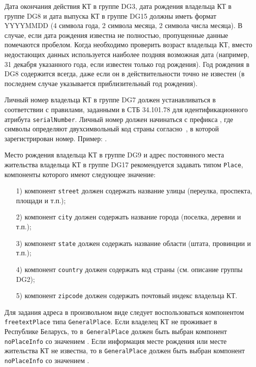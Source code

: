 Дата окончания действия КТ в группе DG3, дата рождения владельца КТ в группе DG8 
и дата выпуска КТ в группе DG15 должны иметь формат YYYYMMDD 
(4 символа года, 2 символа месяца, 2 символа 
числа месяца). В случае, если дата рождения известна не полностью, 
пропущенные данные помечаются пробелом. Когда необходимо проверить 
возраст владельца КТ, вместо недостающих данных используется наиболее 
поздняя возможная дата (например, 31 декабря указанного года, если 
известен только год рождения). Год рождения в DG8 содержится всегда, даже 
если он в действительности точно не известен (в последнем случае 
указывается приблизительный год рождения). 

Личный номер владельца КТ в группе DG7 должен устанавливаться в соответствии с
правилами, заданными в СТБ 34.101.78 для идентификационного атрибута
\verb|serialNumber|. Личный номер должен начинаться с префикса
, где символы  определяют двухсимвольный код страны
согласно~\cite{CountryCodes}, в которой зарегистрирован номер.
Пример: .

Место рождения владельца КТ в группе DG9 и адрес постоянного места жительства
владельца КТ в группе DG17 рекомендуется задавать типом \verb|Place|, 
компоненты которого имеют следующее значение: 
\begin{enumerate}
\item[1)]
компонент \verb|street| должен содержать название улицы (переулка, 
проспекта, площади и т.п.); 
\item[2)]
компонент \verb|city| должен содержать название города (поселка, деревни и т.п.); 
\item[3)]
компонент \verb|state| должен содержать название области (штата, провинции и т.п.);
\item[4)]
компонент \verb|country| должен содержать код страны (см. описание группы DG2);
\item[5)]
компонент \verb|zipcode| должен содержать почтовый индекс владельца КТ.
\end{enumerate}

Для задания адреса в произвольном виде следует воспользоваться компонентом 
\verb|freetextPlace| типа \verb|GeneralPlace|. Если владелец КТ не проживает в 
Республике Беларусь, то в~\verb|GeneralPlace| должен быть выбран компонент 
\verb|noPlaceInfo| со значением . 
Если информация месте рождения или месте жительства 
КТ не известна, то в \verb|GeneralPlace| 
должен быть выбран компонент \verb|noPlaceInfo| со значением 
. 

